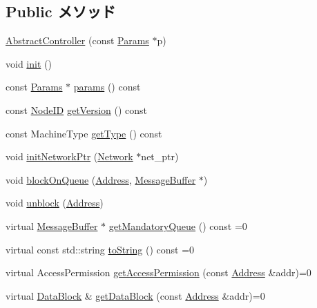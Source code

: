 \subsection*{Public メソッド}
\begin{DoxyCompactItemize}
\item 
\hyperlink{classAbstractController_a59d22e188a5f6fde018cb048098296d5}{AbstractController} (const \hyperlink{classAbstractController_a8dd24df4fce13403813bb4f7243a3b13}{Params} $\ast$p)
\item 
void \hyperlink{classAbstractController_a02fd73d861ef2e4aabb38c0c9ff82947}{init} ()
\item 
const \hyperlink{classAbstractController_a8dd24df4fce13403813bb4f7243a3b13}{Params} $\ast$ \hyperlink{classAbstractController_acd3c3feb78ae7a8f88fe0f110a718dff}{params} () const 
\item 
const \hyperlink{TypeDefines_8hh_a83c14b4ae37e80071f6b3506a6c46151}{NodeID} \hyperlink{classAbstractController_a35b384df19605d0186339f088df677d5}{getVersion} () const 
\item 
const MachineType \hyperlink{classAbstractController_a7a63a33844df1ce5a3b16096dfbbe0f9}{getType} () const 
\item 
void \hyperlink{classAbstractController_a319f9c65d0c91a62be0c99b53a702e8d}{initNetworkPtr} (\hyperlink{classNetwork}{Network} $\ast$net\_\-ptr)
\item 
void \hyperlink{classAbstractController_af682f6c6bb8d16137c284112954156fb}{blockOnQueue} (\hyperlink{classAddress}{Address}, \hyperlink{classMessageBuffer}{MessageBuffer} $\ast$)
\item 
void \hyperlink{classAbstractController_a6da828f9409955e467e80f6d5290fcfd}{unblock} (\hyperlink{classAddress}{Address})
\item 
virtual \hyperlink{classMessageBuffer}{MessageBuffer} $\ast$ \hyperlink{classAbstractController_a80b4b6fca935f6914fd15ea5715e2170}{getMandatoryQueue} () const =0
\item 
virtual const std::string \hyperlink{classAbstractController_adb24cab1ca6d817bdcdef245731b8b77}{toString} () const =0
\item 
virtual AccessPermission \hyperlink{classAbstractController_ab14bc832dc06fbcb264f043d44a8915c}{getAccessPermission} (const \hyperlink{classAddress}{Address} \&addr)=0
\item 
virtual \hyperlink{classDataBlock}{DataBlock} \& \hyperlink{classAbstractController_ae014657139e530ad9d75dfd8f52302a4}{getDataBlock} (const \hyperlink{classAddress}{Address} \&addr)=0

\end{DoxyCompactItemize}
